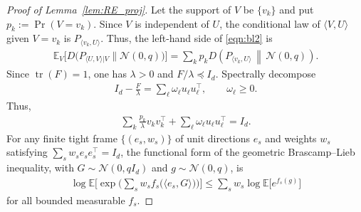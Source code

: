\documentclass[11pt,onecolumn]{IEEEtran}
\newcommand{\calN}{\mathcal{N}}
\newcommand{\bbE}{\mathbb{E}}
\DeclareMathOperator{\tr}{tr}
\begin{document}
\begin{proof}[Proof of Lemma~\ref{lem:RE_proj}]
    Let the support of $V$ be $\{v_k\}$ and put
$p_k:=\Pr(V=v_k)$. Since $V$ is independent of $U$, the conditional
law of $\langle V,U\rangle$ given $V=v_k$ is
$P_{\langle v_k,U\rangle}$. Thus, the left-hand side of
\eqref{eqn:bl2} is
\begin{align}
 \bbE_V \Big[ D\big(P_{ \langle U,V \rangle | V} \|\calN(0,q) \big) \Big]=\sum_k p_k
D\left(P_{\langle v_k,U\rangle}\,\middle\|\,\calN(0,q)\right).
\label{eqn:conditional-projection-sum}
\end{align} Since $\tr(F)=1$, one has $\lambda>0$ and $F/\lambda\preceq I_d$. Spectrally decompose
    \begin{align}
        I_d-\frac{F}{\lambda}=\sum_\ell\omega_\ell u_\ell u_\ell^\top ,\qquad\omega_\ell\ge0.
    \end{align}
    Thus,
    \begin{align}
        \sum_k \frac{p_k}{\lambda} v_k v_k^\top + \sum_\ell\omega_\ell u_\ell u_\ell^\top =I_d. \label{eqn:spectral2}
    \end{align}
    For any finite tight frame $\{(e_s, w_s)\}$ of unit directions $e_s$ and weights $w_s$ satisfying $\sum_s w_s e_s e_s^\top=I_d$, the functional form of the geometric Brascamp–Lieb inequality, with $G\sim \calN(0,qI_d) $ and $g\sim \calN(0,q)$, is \cite{CarlenCorderoErausquin2009}
    \begin{align}
        \log\bbE\bigg[\exp\bigg( \sum_s w_sf_s\big( \langle e_s, G\rangle\big) \bigg)\bigg]\le\sum_s w_s\log\bbE\big[e^{f_s(g)} \big] \label{eqn:bl_functional}
    \end{align}
    for all bounded measurable $f_s$. 


\end{proof}
\end{document}
